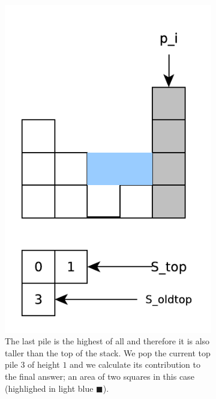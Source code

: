 \begin{figure}
\begin{subfigure}[t]{0.24\textwidth}
		\includegraphics[width=1\linewidth]{sources/trapping_water/images/stack_ex5}
		\caption{The last pile is the highest of all and therefore it is also taller than the top of the stack. We pop the current top pile $3$ of height $1$ and we calculate its contribution to the final answer; an area of two squares in this case (highlighed in light blue \textcolor[HTML]{99ccff}{$\blacksquare$}).}
		\label{fig:trapping_water:stack_ex3}
	 \end{subfigure}
	 \hfill
	 \begin{subfigure}[t]{0.24\textwidth}

\end{subfigure}
\end{figure}

